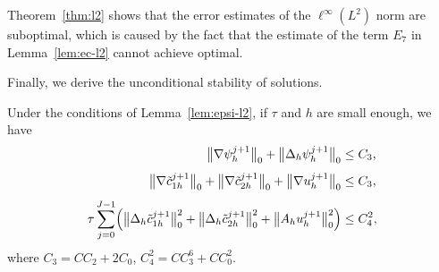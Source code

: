 \begin{remark}\label{rem:suboptimal}
Theorem~\ref{thm:l2} shows that the error estimates of the $\ell^{\infty}(L^{2})$ norm are
suboptimal, which is caused by the fact that the estimate of the term $E_{7}$ in
Lemma~\ref{lem:ec-l2} cannot achieve optimal.
\end{remark}

Finally, we derive the unconditional stability of solutions.

\begin{lemma}\label{lem:stability}
Under the conditions of Lemma~\ref{lem:epsi-l2}, if $\tau$ and $h$ are small enough, we have
\begin{align}
  \bigl\|\nabla\psi_{h}^{j+1}\bigr\|_{0}
  + \bigl\|\Delta_{h}\psi_{h}^{j+1}\bigr\|_{0}
  &\leq C_{3},
  \label{eq:stab-psi}\\[4pt]
  \bigl\|\nabla\tilde{c}_{1h}^{j+1}\bigr\|_{0}
  + \bigl\|\nabla\tilde{c}_{2h}^{j+1}\bigr\|_{0}
  + \bigl\|\nabla u_{h}^{j+1}\bigr\|_{0}
  &\leq C_{3},
  \label{eq:stab-H1}\\[4pt]
  \tau\sum_{j=0}^{J-1}\Bigl(\bigl\|\Delta_{h}\tilde{c}_{1h}^{j+1}\bigr\|_{0}^{2}
                            + \bigl\|\Delta_{h}\tilde{c}_{2h}^{j+1}\bigr\|_{0}^{2}
                            + \bigl\|A_{h}u_{h}^{j+1}\bigr\|_{0}^{2}\Bigr)
  &\leq C_{4}^{2},
  \label{eq:stab-H2}
\end{align}
where $C_{3} = CC_{2} + 2C_{0}$, $C_{4}^{2} = CC_{3}^{6} + CC_{0}^{2}$.
\end{lemma}

